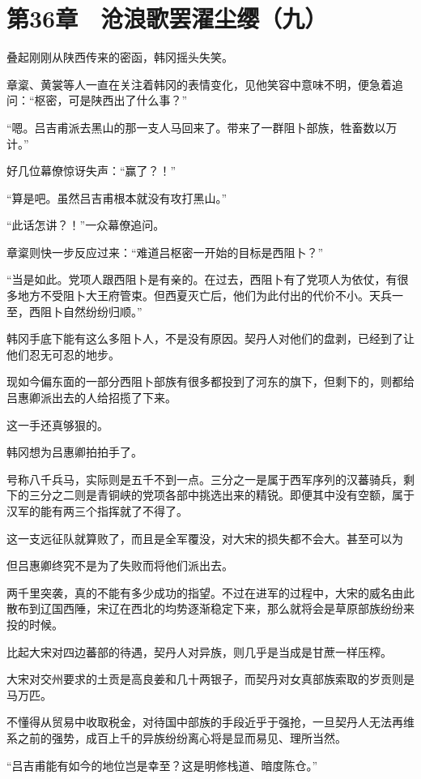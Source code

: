 \section{第36章　沧浪歌罢濯尘缨（九）}

叠起刚刚从陕西传来的密函，韩冈摇头失笑。

章楶、黄裳等人一直在关注着韩冈的表情变化，见他笑容中意味不明，便急着追问：“枢密，可是陕西出了什么事？”

“嗯。吕吉甫派去黑山的那一支人马回来了。带来了一群阻卜部族，牲畜数以万计。”

好几位幕僚惊讶失声：“赢了？！”

“算是吧。虽然吕吉甫根本就没有攻打黑山。”

“此话怎讲？！”一众幕僚追问。

章楶则快一步反应过来：“难道吕枢密一开始的目标是西阻卜？”

“当是如此。党项人跟西阻卜是有亲的。在过去，西阻卜有了党项人为依仗，有很多地方不受阻卜大王府管束。但西夏灭亡后，他们为此付出的代价不小。天兵一至，西阻卜自然纷纷归顺。”

韩冈手底下能有这么多阻卜人，不是没有原因。契丹人对他们的盘剥，已经到了让他们忍无可忍的地步。

现如今偏东面的一部分西阻卜部族有很多都投到了河东的旗下，但剩下的，则都给吕惠卿派出去的人给招揽了下来。

这一手还真够狠的。

韩冈想为吕惠卿拍拍手了。

号称八千兵马，实际则是五千不到一点。三分之一是属于西军序列的汉蕃骑兵，剩下的三分之二则是青铜峡的党项各部中挑选出来的精锐。即便其中没有空额，属于汉军的能有两三个指挥就了不得了。

这一支远征队就算败了，而且是全军覆没，对大宋的损失都不会大。甚至可以为

但吕惠卿终究不是为了失败而将他们派出去。

两千里突袭，真的不能有多少成功的指望。不过在进军的过程中，大宋的威名由此散布到辽国西陲，宋辽在西北的均势逐渐稳定下来，那么就将会是草原部族纷纷来投的时候。

比起大宋对四边蕃部的待遇，契丹人对异族，则几乎是当成是甘蔗一样压榨。

大宋对交州要求的土贡是高良姜和几十两银子，而契丹对女真部族索取的岁贡则是马万匹。

不懂得从贸易中收取税金，对待国中部族的手段近乎于强抢，一旦契丹人无法再维系之前的强势，成百上千的异族纷纷离心将是显而易见、理所当然。

“吕吉甫能有如今的地位岂是幸至？这是明修栈道、暗度陈仓。”

